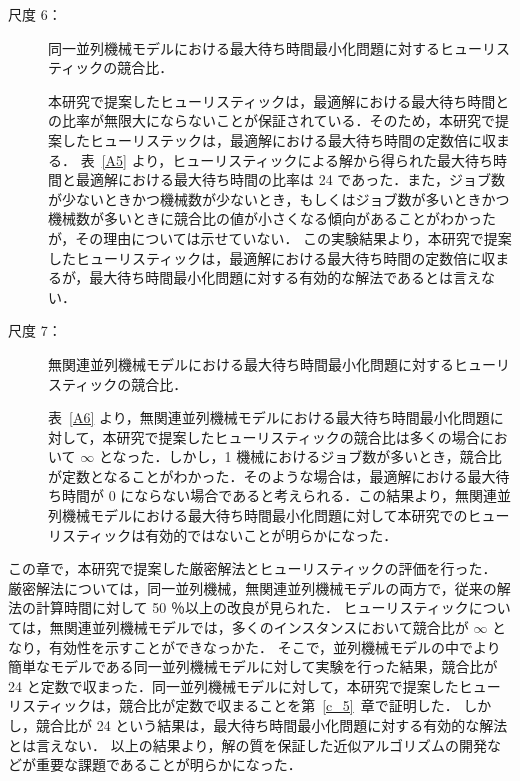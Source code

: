\documentclass[12pt]{optlab-bachelor}
\begin{document}
\begin{description}
  \item[尺度 6：] 同一並列機械モデルにおける最大待ち時間最小化問題に対するヒューリスティックの競合比．

  本研究で提案したヒューリスティックは，最適解における最大待ち時間との比率が無限大にならないことが保証されている．そのため，本研究で提案したヒューリステックは，最適解における最大待ち時間の定数倍に収まる．
  表~\ref{A5} より，ヒューリスティックによる解から得られた最大待ち時間と最適解における最大待ち時間の比率は 24 であった．また，ジョブ数が少ないときかつ機械数が少ないとき，もしくはジョブ数が多いときかつ機械数が多いときに競合比の値が小さくなる傾向があることがわかったが，その理由については示せていない．
  この実験結果より，本研究で提案したヒューリスティックは，最適解における最大待ち時間の定数倍に収まるが，最大待ち時間最小化問題に対する有効的な解法であるとは言えない．

  \item[尺度 7：] 無関連並列機械モデルにおける最大待ち時間最小化問題に対するヒューリスティックの競合比．

  表~\ref{A6} より，無関連並列機械モデルにおける最大待ち時間最小化問題に対して，本研究で提案したヒューリスティックの競合比は多くの場合において $\infty$ となった．しかし，1 機械におけるジョブ数が多いとき，競合比が定数となることがわかった．そのような場合は，最適解における最大待ち時間が 0 にならない場合であると考えられる．この結果より，無関連並列機械モデルにおける最大待ち時間最小化問題に対して本研究でのヒューリスティックは有効的ではないことが明らかになった．
\end{description}

この章で，本研究で提案した厳密解法とヒューリスティックの評価を行った．
厳密解法については，同一並列機械，無関連並列機械モデルの両方で，従来の解法の計算時間に対して 50 ％以上の改良が見られた．
ヒューリスティックについては，無関連並列機械モデルでは，多くのインスタンスにおいて競合比が $\infty$ となり，有効性を示すことができなっかた．
そこで，並列機械モデルの中でより簡単なモデルである同一並列機械モデルに対して実験を行った結果，競合比が 24 と定数で収まった．同一並列機械モデルに対して，本研究で提案したヒューリスティックは，競合比が定数で収まることを第~\ref{c_5}~章で証明した．
しかし，競合比が 24 という結果は，最大待ち時間最小化問題に対する有効的な解法とは言えない．
以上の結果より，解の質を保証した近似アルゴリズムの開発などが重要な課題であることが明らかになった．
\end{document}
